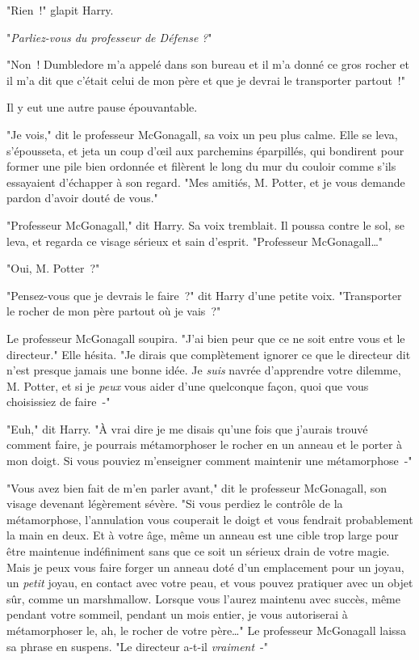 "Rien~!" glapit Harry.

"\emph{Parliez-vous du professeur de Défense} \emph{?}"

"Non~! Dumbledore m'a appelé dans son bureau et il m'a donné ce gros rocher et il m'a dit que c'était celui de mon père et que je devrai le transporter partout~!"

Il y eut une autre pause épouvantable.

"Je vois," dit le professeur McGonagall, sa voix un peu plus calme. Elle se leva, s'épousseta, et jeta un coup d'œil aux parchemins éparpillés, qui bondirent pour former une pile bien ordonnée et filèrent le long du mur du couloir comme s'ils essayaient d'échapper à son regard. "Mes amitiés, M. Potter, et je vous demande pardon d'avoir douté de vous."

"Professeur McGonagall," dit Harry. Sa voix tremblait. Il poussa contre le sol, se leva, et regarda ce visage sérieux et sain d'esprit. "Professeur McGonagall…"

"Oui, M. Potter~?"

"Pensez-vous que je devrais le faire~?" dit Harry d'une petite voix. "Transporter le rocher de mon père partout où je vais~?"

Le professeur McGonagall soupira. "J'ai bien peur que ce ne soit entre vous et le directeur." Elle hésita. "Je dirais que complètement ignorer ce que le directeur dit n'est presque jamais une bonne idée. Je \emph{suis} navrée d'apprendre votre dilemme, M. Potter, et si je \emph{peux} vous aider d'une quelconque façon, quoi que vous choisissiez de faire~-"

"Euh," dit Harry. "À vrai dire je me disais qu'une fois que j'aurais trouvé comment faire, je pourrais métamorphoser le rocher en un anneau et le porter à mon doigt. Si vous pouviez m'enseigner comment maintenir une métamorphose~-"

"Vous avez bien fait de m'en parler avant," dit le professeur McGonagall, son visage devenant légèrement sévère. "Si vous perdiez le contrôle de la métamorphose, l'annulation vous couperait le doigt et vous fendrait probablement la main en deux. Et à votre âge, même un anneau est une cible trop large pour être maintenue indéfiniment sans que ce soit un sérieux drain de votre magie. Mais je peux vous faire forger un anneau doté d'un emplacement pour un joyau, un \emph{petit} joyau, en contact avec votre peau, et vous pouvez pratiquer avec un objet sûr, comme un marshmallow. Lorsque vous l'aurez maintenu avec succès, même pendant votre sommeil, pendant un mois entier, je vous autoriserai à métamorphoser le, ah, le rocher de votre père…" Le professeur McGonagall laissa sa phrase en suspens. "Le directeur a-t-il \emph{vraiment}~-"

